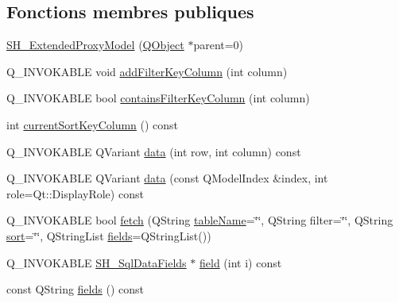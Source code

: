 \subsection*{Fonctions membres publiques}
\begin{DoxyCompactItemize}
\item 
\hyperlink{classSimpleHotel_1_1SH__ExtendedProxyModel_a67be298376a1c82cc96b7789bb6b301c}{S\-H\-\_\-\-Extended\-Proxy\-Model} (\hyperlink{classQObject}{Q\-Object} $\ast$parent=0)
\item 
Q\-\_\-\-I\-N\-V\-O\-K\-A\-B\-L\-E void \hyperlink{classSimpleHotel_1_1SH__ExtendedProxyModel_af8036ffa208ebaf55129cce307c3e296}{add\-Filter\-Key\-Column} (int column)
\item 
Q\-\_\-\-I\-N\-V\-O\-K\-A\-B\-L\-E bool \hyperlink{classSimpleHotel_1_1SH__ExtendedProxyModel_a4db5231a36976dd249ec1439422e331c}{contains\-Filter\-Key\-Column} (int column)
\item 
int \hyperlink{classSimpleHotel_1_1SH__ExtendedProxyModel_a2acd8779c72617f4b6a195ee9341b28b}{current\-Sort\-Key\-Column} () const 
\item 
Q\-\_\-\-I\-N\-V\-O\-K\-A\-B\-L\-E Q\-Variant \hyperlink{classSimpleHotel_1_1SH__ExtendedProxyModel_a24edf7c777ce9e00a07b30614ee71019}{data} (int row, int column) const 
\item 
Q\-\_\-\-I\-N\-V\-O\-K\-A\-B\-L\-E Q\-Variant \hyperlink{classSimpleHotel_1_1SH__ExtendedProxyModel_a25bc1047c6e9835d9d3c580e0a4ec42a}{data} (const Q\-Model\-Index \&index, int role=Qt\-::\-Display\-Role) const 
\item 
Q\-\_\-\-I\-N\-V\-O\-K\-A\-B\-L\-E bool \hyperlink{classSimpleHotel_1_1SH__ExtendedProxyModel_a422dc77c44ec3ded9291812efb128053}{fetch} (Q\-String \hyperlink{classSimpleHotel_1_1SH__ExtendedProxyModel_a49617ea8bab745425beec3dbd3fddba7}{table\-Name}=\char`\"{}\char`\"{}, Q\-String filter=\char`\"{}\char`\"{}, Q\-String \hyperlink{classSimpleHotel_1_1SH__ExtendedProxyModel_a5d7686a9fae295e0662057b8450c8a8d}{sort}=\char`\"{}\char`\"{}, Q\-String\-List \hyperlink{classSimpleHotel_1_1SH__ExtendedProxyModel_a4b57bc85b18fa1e71073526abb798fb6}{fields}=Q\-String\-List())
\item 
Q\-\_\-\-I\-N\-V\-O\-K\-A\-B\-L\-E \hyperlink{classSimpleHotel_1_1SH__SqlDataFields}{S\-H\-\_\-\-Sql\-Data\-Fields} $\ast$ \hyperlink{classSimpleHotel_1_1SH__ExtendedProxyModel_ac091225266a35c84307835f40d9b6e9b}{field} (int i) const 
\item 
const Q\-String \hyperlink{classSimpleHotel_1_1SH__ExtendedProxyModel_a4b57bc85b18fa1e71073526abb798fb6}{fields} () const 

\end{DoxyCompactItemize}
